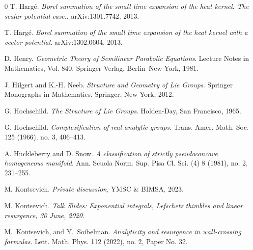 \documentclass[11pt]{amsart}
\theoremstyle{plain}
\theoremstyle{definition}
\begin{document}
\begin{thebibliography}{0}
 T. Harg\'e.
\textit{Borel summation of the small time expansion of the heat kernel. The scalar potential case.}.
arXiv:1301.7742, 2013.


 T. Harg\'e.
\textit{Borel summation of the small time expansion of the heat kernel with a vector potential}.
arXiv:1302.0604, 2013.



D. Henry.
\textit{Geometric Theory of Semilinear Parabolic Equations}.
Lecture Notes in Mathematics, Vol. 840. Springer-Verlag, Berlin--New York, 1981.


J. Hilgert and K.-H. Neeb.
\textit{Structure and Geometry of Lie Groups}.
Springer Monographs in Mathematics. Springer, New York, 2012.


G. Hochschild.
\textit{The Structure of Lie Groups}.
Holden-Day, San Francisco, 1965.


G. Hochschild.
\textit{Complexification of real analytic groups}.
Trans. Amer. Math. Soc. 125 (1966), no. 3, 406--413.




 A. Huckleberry and D. Snow.
\textit{A classification of strictly pseudoconcave homogeneous manifold}.
Ann. Scuola Norm. Sup. Pisa Cl. Sci. (4) 8 (1981), no. 2, 231--255.





 M. Kontsevich.
\textit{Private discussion}, YMSC \& BIMSA, 2023.

 M. Kontsevich.
\textit{Talk Slides: Exponential integrals, Lefschetz thimbles and linear resurgence, 30 June, 2020}. 

M.~Kontsevich, and Y.~Soibelman. \textit{Analyticity and resurgence in wall-crossing formulas.} Lett. Math. Phys. 112 (2022), no. 2, Paper No. 32.



\end{thebibliography}
\end{document}
